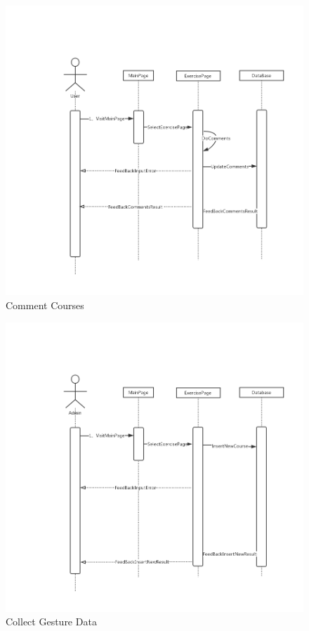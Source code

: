 \documentclass[16pt]{scrreprt}
\begin{document}
\begin{figure}[H]
    \includegraphics[width=\linewidth]{./FuncPhoto/13.png}   
    \caption{Comment Courses}
\end{figure}

\begin{figure}[H]
    \includegraphics[width=\linewidth]{./FuncPhoto/14.png}   
    \caption{Collect Gesture Data}
\end{figure}
\end{document}
